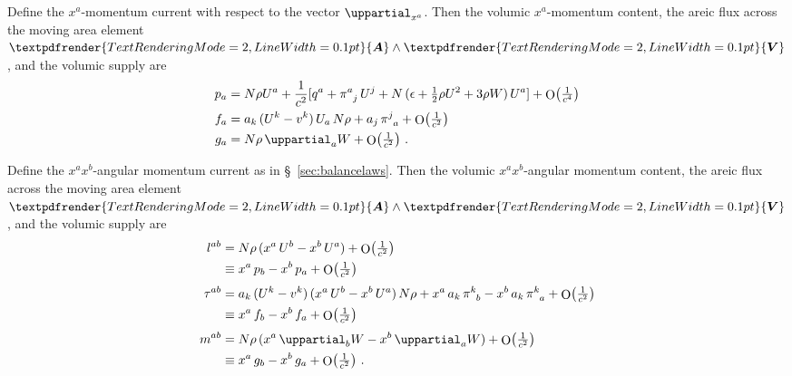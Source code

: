 \documentclass[\ifafour a4paper,12pt,\else a5paper,10pt,\fi%
onecolumn,oneside,article,%
british%
]{memoir}
\theoremstyle{remark}
\theoremstyle{innote}
\renewcommand*{\bm}[1]{\textpdfrender{TextRenderingMode=2,LineWidth=0.1pt}{\boldsymbol{#1}}}
\newcommand*{\de}{\mathop{}\!\uppartial}%
\DeclareMathOperator{\Ord}{O}%
\renewcommand*{\|}[1][]{\nonscript\:#1\vert\nonscript\:\mathopen{}}
\newcommand*{\sect}{\S}%
\renewcommand*{\i}{{}\indices}
\newcommand*{\se}[1]{\de_{#1}}
\newcommand*{\yW}{W}
\newcommand*{\Oc}[1]{\Ord\bigl(\tfrac{1}{c^{#1}}\bigr)}
\begin{document}
Define the $x^{a}$-momentum current with respect to the vector $\se{x^{a}}$. Then the volumic $x^{a}$-momentum content, the areic flux across the moving area element $\bm{A}\land\bm{V}$, and the volumic supply are
\begin{equation}
  \label{eq:momentum_matter_GCRS}
  \begin{aligned}
    p_{a} &=
    N\rho U^{a} + \frac{1}{c^{2}} [
    q^{a} + \pi\i{^{a}_{j}}\,U^{j} +
    N\,(\epsilon + \tfrac12 \rho U^{2} + 3\rho\yW)\, U^{a}
    ] + \Oc{4}
    \\
    f_{a} &=
    \!\begin{multlined}[t][0.8\linewidth]
      a_{k}\,(U^{k}-v^{k})\,U_{a}\,N\rho + a_{j}\,\pi\i{^{j}_{a}} +
      \Oc{2}
    \end{multlined}
    \\
    g_{a} &= N\rho\de_{a}\yW + \Oc{2} \ .
  \end{aligned}
\end{equation}

Define the $x^{a}x^{b}$-angular momentum current as in \sect~\ref{sec:balancelaws}. Then the volumic $x^{a}x^{b}$-angular momentum content, the areic flux across the moving area element $\bm{A}\land\bm{V}$, and the volumic supply are
\begin{equation}
  \label{eq:ang_momentum_matter_GCRS}
  \begin{aligned}
    l^{ab} &=
    N\rho\, (x^{a}\,U^{b} - x^{b}\,U^{a}) + \Oc{2}
    \\
    &\equiv x^{a}\,p_{b} - x^{b}\,p_{a} + \Oc{2}
    \\[\jot]
    \tau^{ab} &=
    \!\begin{multlined}[t][0.8\linewidth]
      a_{k}\,(U^{k}-v^{k}) \, (x^{a}\,U^{b} - x^{b}\,U^{a})\,N\rho +
      x^{a}\,a_{k}\,\pi\i{^{k}_{b}} - x^{b}\,a_{k}\,\pi\i{^{k}_{a}} +
      \Oc{2}
    \end{multlined}
    \\
    &\equiv x^{a}\,f_{b} - x^{b}\,f_{a} + \Oc{2}
    \\[\jot]
    m^{ab} &= N\rho\,(x^{a}\de_{b}\yW - x^{b}\de_{a}\yW)+ \Oc{2} 
    \\
    &\equiv x^{a}\,g_{b} - x^{b}\,g_{a} + \Oc{2} \ .
  \end{aligned}
\end{equation}
\end{document}
